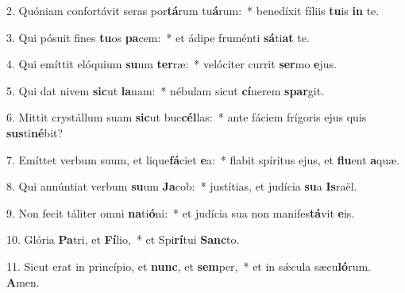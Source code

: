 2. Quóniam confortávit seras por\textbf{tá}rum tu\textbf{á}rum:~* benedíxit fíliis \textbf{tu}is \textbf{in} te.

3. Qui pósuit fines \textbf{tu}os \textbf{pa}cem:~* et ádipe fruménti \textbf{sá}ti\textbf{at} te.

4. Qui emíttit elóquium \textbf{su}um \textbf{ter}ræ:~* velóciter currit \textbf{ser}mo \textbf{e}jus.

5. Qui dat nivem \textbf{sic}ut \textbf{la}nam:~* nébulam sicut \textbf{cí}nerem \textbf{spar}git.

6. Mittit crystállum suam \textbf{sic}ut buc\textbf{cél}las:~* ante fáciem frígoris ejus quis \textbf{sus}ti\textbf{né}bit?

7. Emíttet verbum suum, et lique\textbf{fá}ciet \textbf{e}a:~* flabit spíritus ejus, et \textbf{flu}ent \textbf{a}quæ.

8. Qui annúntiat verbum \textbf{su}um \textbf{Ja}cob:~* justítias, et judícia \textbf{su}a \textbf{Is}raël.

9. Non fecit táliter omni \textbf{na}ti\textbf{ó}ni:~* et judícia sua non manifes\textbf{tá}vit \textbf{e}is.

10. Glória \textbf{Pa}tri, et \textbf{Fí}lio,~* et Spi\textbf{rí}tui \textbf{Sanc}to.

11. Sicut erat in princípio, et \textbf{nunc}, et \textbf{sem}per,~* et in sǽcula sæcu\textbf{ló}rum. \textbf{A}men.